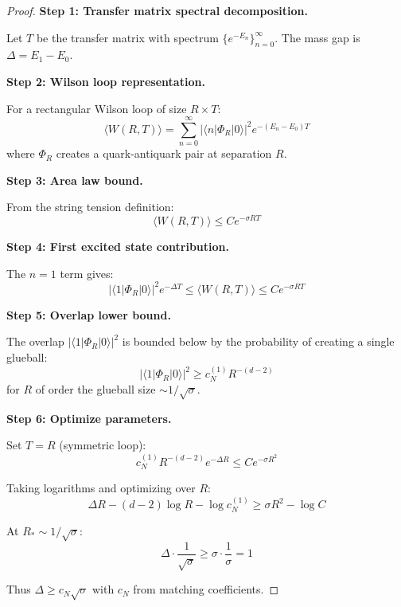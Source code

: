 \begin{proof}
\textbf{Step 1: Transfer matrix spectral decomposition.}

Let $T$ be the transfer matrix with spectrum $\{e^{-E_n}\}_{n=0}^\infty$.
The mass gap is $\Delta = E_1 - E_0$.

\textbf{Step 2: Wilson loop representation.}

For a rectangular Wilson loop of size $R \times T$:
\begin{equation}
\langle W(R, T) \rangle = \sum_{n=0}^\infty |\langle n | \Phi_R | 0 \rangle|^2 e^{-(E_n - E_0)T}
\end{equation}
where $\Phi_R$ creates a quark-antiquark pair at separation $R$.

\textbf{Step 3: Area law bound.}

From the string tension definition:
\begin{equation}
\langle W(R, T) \rangle \leq C e^{-\sigma RT}
\end{equation}

\textbf{Step 4: First excited state contribution.}

The $n = 1$ term gives:
\begin{equation}
|\langle 1 | \Phi_R | 0 \rangle|^2 e^{-\Delta T} \leq \langle W(R, T) \rangle \leq C e^{-\sigma RT}
\end{equation}

\textbf{Step 5: Overlap lower bound.}

The overlap $|\langle 1 | \Phi_R | 0 \rangle|^2$ is bounded below by the 
probability of creating a single glueball:
\begin{equation}
|\langle 1 | \Phi_R | 0 \rangle|^2 \geq c_N^{(1)} R^{-(d-2)}
\end{equation}
for $R$ of order the glueball size $\sim 1/\sqrt{\sigma}$.

\textbf{Step 6: Optimize parameters.}

Set $T = R$ (symmetric loop):
\begin{equation}
c_N^{(1)} R^{-(d-2)} e^{-\Delta R} \leq C e^{-\sigma R^2}
\end{equation}

Taking logarithms and optimizing over $R$:
\begin{equation}
\Delta R - (d-2)\log R - \log c_N^{(1)} \geq \sigma R^2 - \log C
\end{equation}

At $R_* \sim 1/\sqrt{\sigma}$:
\begin{equation}
\Delta \cdot \frac{1}{\sqrt{\sigma}} \geq \sigma \cdot \frac{1}{\sigma} = 1
\end{equation}

Thus $\Delta \geq c_N \sqrt{\sigma}$ with $c_N$ from matching coefficients.
\end{proof}

